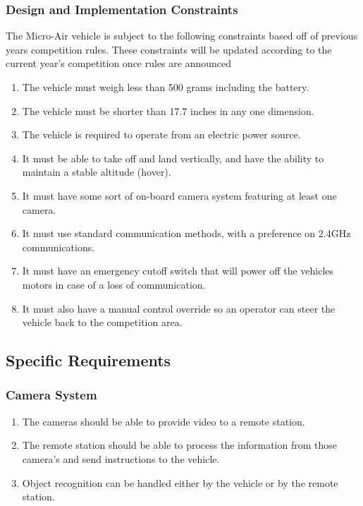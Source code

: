 \documentclass[onecolumn, draftclsnofoot,10pt, compsoc]{IEEEtran}
\begin{document}
\subsubsection{Design and Implementation Constraints}

The Micro-Air vehicle is subject to the following constraints based off of previous years competition rules\cite{r2}. These constraints will be updated according to the current year’s competition once rules are announced
\begin{enumerate}
\item The vehicle must weigh less than 500 grams including the battery.
\item The vehicle must be shorter than 17.7 inches in any one dimension. 
\item The vehicle is required to operate from an electric power source.
\item It must be able to take off and land vertically, and have the ability to maintain a stable altitude (hover).
\item It must have some sort of on-board camera system featuring at least one camera.
\item It must use standard communication methods, with a preference on 2.4GHz communications.
\item It must have an emergency cutoff switch that will power off the vehicles motors in case of a loss of communication.
\item It must also have a manual control override so an operator can steer the vehicle back to the competition area. 
\end{enumerate}








\subsection{Specific Requirements}
\subsubsection{Camera System}
\begin{enumerate}
\item The cameras should be able to provide video to a remote station. 

\item The remote station should be able to process the information from those camera’s and send instructions to the vehicle. 

\item Object recognition can be handled either by the vehicle or by the remote station.

\end{enumerate}
\end{document}
